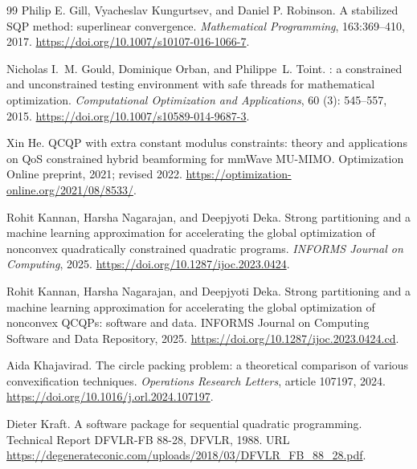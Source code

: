 \documentclass[pdflatex,sn-mathphys-num]{sn-jnl}
\theoremstyle{thmstyleone}
\theoremstyle{thmstylethree}
\begin{document}
\begin{thebibliography}{99}
Philip E. Gill, Vyacheslav Kungurtsev, and Daniel P. Robinson.
\newblock A stabilized SQP method: superlinear convergence.
\newblock \emph{Mathematical Programming}, 163:369--410, 2017.
\newblock \url{https://doi.org/10.1007/s10107-016-1066-7}.

Nicholas I.~M. Gould, Dominique Orban, and Philippe~L. Toint.
: a constrained and unconstrained testing environment with
  safe threads for mathematical optimization.
\newblock \emph{Computational Optimization and Applications}, 60
  (3): 545--557, 2015.
\newblock \url{https://doi.org/10.1007/s10589-014-9687-3}.

Xin He.
\newblock QCQP with extra constant modulus constraints: theory and applications on QoS constrained hybrid beamforming for mmWave MU-MIMO.
\newblock Optimization Online preprint, 2021; revised 2022.
\newblock \url{https://optimization-online.org/2021/08/8533/}.

Rohit Kannan, Harsha Nagarajan, and Deepjyoti Deka.
\newblock Strong partitioning and a machine learning approximation for accelerating the global optimization of nonconvex quadratically constrained quadratic programs.
\newblock \emph{INFORMS Journal on Computing}, 2025.
\newblock \url{https://doi.org/10.1287/ijoc.2023.0424}.

Rohit Kannan, Harsha Nagarajan, and Deepjyoti Deka.
\newblock Strong partitioning and a machine learning approximation for accelerating the global optimization of nonconvex QCQPs: software and data.
\newblock INFORMS Journal on Computing Software and Data Repository, 2025.
\newblock \url{https://doi.org/10.1287/ijoc.2023.0424.cd}.

Aida Khajavirad.
\newblock The circle packing problem: a theoretical comparison of various convexification techniques.
\newblock \emph{Operations Research Letters}, article 107197, 2024.
\newblock \url{https://doi.org/10.1016/j.orl.2024.107197}.

Dieter Kraft.
\newblock A software package for sequential quadratic programming.
\newblock Technical Report DFVLR-FB 88-28, DFVLR, 1988.
\newblock URL
  \url{https://degenerateconic.com/uploads/2018/03/DFVLR_FB_88_28.pdf}.


\end{thebibliography}
\end{document}
